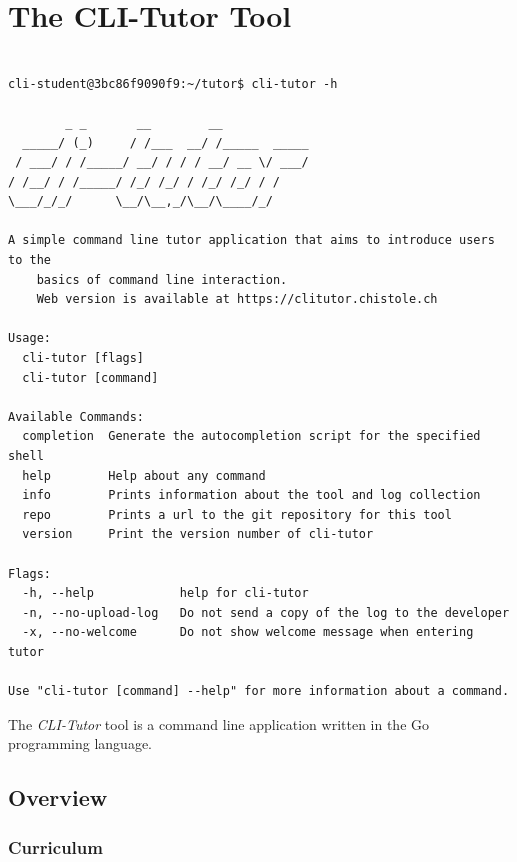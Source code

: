 \chapter{The CLI-Tutor Tool}
%
\label{chap:clitutor}

\begin{lstlisting}[float=htbp, keepspaces, frame=single, language={}, caption=Output of the help flag of \textit{CLI-Tutor} running in a docker container.]

cli-student@3bc86f9090f9:~/tutor$ cli-tutor -h

        _ _       __        __
  _____/ (_)     / /___  __/ /_____  _____
 / ___/ / /_____/ __/ / / / __/ __ \/ ___/
/ /__/ / /_____/ /_/ /_/ / /_/ /_/ / /
\___/_/_/      \__/\__,_/\__/\____/_/

A simple command line tutor application that aims to introduce users to the
    basics of command line interaction.
    Web version is available at https://clitutor.chistole.ch

Usage:
  cli-tutor [flags]
  cli-tutor [command]

Available Commands:
  completion  Generate the autocompletion script for the specified shell
  help        Help about any command
  info        Prints information about the tool and log collection
  repo        Prints a url to the git repository for this tool
  version     Print the version number of cli-tutor

Flags:
  -h, --help            help for cli-tutor
  -n, --no-upload-log   Do not send a copy of the log to the developer
  -x, --no-welcome      Do not show welcome message when entering tutor

Use "cli-tutor [command] --help" for more information about a command.
\end{lstlisting}


The \textit{CLI-Tutor} tool is a command line application written in the Go programming language. 


\section{Overview}
\subsection{Curriculum}
